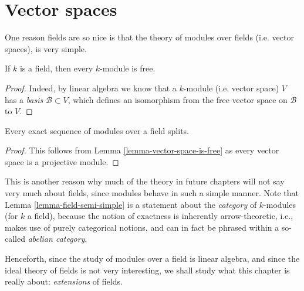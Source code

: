 \section{Vector spaces}
\label{section-vector-spaces}

\noindent
One reason fields are so nice is that the theory of modules over fields
(i.e. vector spaces), is very simple.

\begin{lemma}
\label{lemma-vector-space-is-free}
If $k$ is a field, then every $k$-module is free.
\end{lemma}

\begin{proof}
Indeed, by linear algebra we know that a $k$-module (i.e. vector space)
$V$ has a {\it basis} $\mathcal{B} \subset V$, which defines an isomorphism
from the free vector space on $\mathcal{B}$ to $V$.
\end{proof}

\begin{lemma}
\label{lemma-field-semi-simple}
Every exact sequence of modules over a field splits.
\end{lemma}

\begin{proof}
This follows from Lemma \ref{lemma-vector-space-is-free} as every vector
space is a projective module.
\end{proof}

\noindent
This is another reason why much of the theory in future chapters will not say
very much about fields, since modules behave in such a simple manner.
Note that Lemma \ref{lemma-field-semi-simple} is a statement about the
{\it category} of $k$-modules (for $k$ a field), because the notion of
exactness is inherently arrow-theoretic, i.e., makes use of purely categorical
notions, and can in fact be phrased within a so-called {\it abelian category}.

\medskip\noindent
Henceforth, since the study of modules over a field is linear algebra, and
since the ideal theory of fields is not very interesting, we shall study what
this chapter is really about: {\it extensions} of fields.


